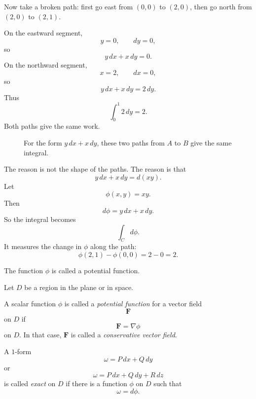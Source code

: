 Now take a broken path: first go east from \((0,0)\) to \((2,0)\), then go north from
\((2,0)\) to \((2,1)\).

On the eastward segment,
\[
    y=0,\qquad dy=0,
\]
so
\[
    y\,dx+x\,dy=0.
\]
On the northward segment,
\[
    x=2,\qquad dx=0,
\]
so
\[
    y\,dx+x\,dy=2\,dy.
\]
Thus
\[
    \int_0^1 2\,dy=2.
\]
Both paths give the same work.

\begin{figure}[h]
\centering
{}
\caption{For the form \(y\,dx+x\,dy\), these two paths from \(A\) to \(B\) give the
same integral.}
\end{figure}

The reason is not the shape of the paths.  The reason is that
\[
    y\,dx+x\,dy=d(xy).
\]
Let
\[
    \phi(x,y)=xy.
\]
Then
\[
    d\phi=y\,dx+x\,dy.
\]
So the integral becomes
\[
    \int_C d\phi.
\]
It measures the change in \(\phi\) along the path:
\[
    \phi(2,1)-\phi(0,0)=2-0=2.
\]

The function \(\phi\) is called a potential function.

\begin{definition}
Let \(D\) be a region in the plane or in space.

A scalar function \(\phi\) is called a \emph{potential function} for a vector field
\[
    \mathbf F
\]
on \(D\) if
\[
\boxed{
    \mathbf F=\nabla \phi
}
\]
on \(D\).  In that case, \(\mathbf F\) is called a \emph{conservative vector field}.

A \(1\)-form
\[
    \omega=P\,dx+Q\,dy
\]
or
\[
    \omega=P\,dx+Q\,dy+R\,dz
\]
is called \emph{exact} on \(D\) if there is a function \(\phi\) on \(D\) such that
\[
\boxed{
    \omega=d\phi.
}
\]
\end{definition}

